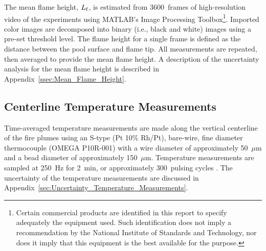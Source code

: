 \documentclass[12pt]{article}
\begin{document}
The mean flame height, $L_{\rm{f}}$, is estimated from 3600~frames of high-resolution video of the experiments using MATLAB’s Image Processing Toolbox\footnote{\label{fn:product} Certain commercial products are identified in this report to specify adequately the equipment used. Such identification does not imply a recommendation by the National Institute of Standards and Technology, nor does it imply that this equipment is the best available for the purpose.}. Imported color images are decomposed into binary (i.e., black and white) images using a pre-set threshold level. The flame height for a single frame is defined as the distance between the pool surface and flame tip. All measurements are repeated, then averaged to provide the mean flame height. A description of the uncertainty analysis for the mean flame height is described in Appendix~\ref{ssec:Mean_Flame_Height}.

\subsection{Centerline Temperature Measurements}
\label{ssec:Temperature_Measurements}

Time-averaged temperature measurements are made along the vertical centerline of the fire plumes using an S-type (Pt 10\% Rh/Pt), bare-wire, fine diameter thermocouple (OMEGA P10R-001) with a wire diameter of approximately 50~$\mu$m and a bead diameter of approximately 150~$\mu$m. Temperature measurements are sampled at \SI{250}{Hz} for \SI{2}{min}, or approximately 300~pulsing cycles \cite{Wang2019}. The uncertainty of the temperature measurements are discussed in Appendix~\ref{sec:Uncertainty_Temperature_Measurements}.
\end{document}
